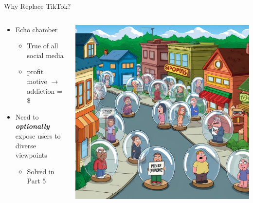 \documentclass[aspectratio=169]{beamer}
\begin{document}
\begin{frame}{Why Replace TikTok?}
\begin{columns}[T]
    \begin{column}[T]{0.5\textwidth}
        \begin{itemize}
            \item Echo chamber
            \begin{itemize}
                \item True of all social media
                \item profit motive $\rightarrow$ addiction = \$
            \end{itemize}
            \item Need to \textit{\textbf{optionally}} expose users to diverse viewpoints
            \begin{itemize}
                \item Solved in Part 5
            \end{itemize}
        \end{itemize}
    \end{column}
    \begin{column}{0.5\textwidth}
        \includegraphics[height=0.8\textheight]{imgs/why_replace/bubble_town.jpeg}
    \end{column}
\end{columns}
\end{frame}
\end{document}
